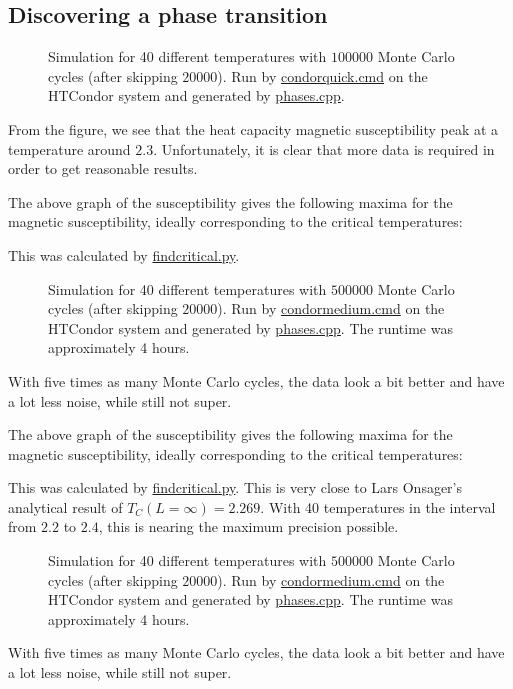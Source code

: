 \documentclass[12pt,english,a4paper]{article}
\newcommand{\program}[1]{\href{https://github.com/anjohan/Offentlig/blob/master/FYS3150/Oblig4/#1}{#1}}
\begin{document}
\subsection{Discovering a phase transition}\label{phases}

\begin{figure}[H]
\centering

\caption{Simulation for 40 different temperatures with \(\num{100000}\) Monte Carlo cycles (after skipping \(\num{20000}\)). Run by \program{condorquick.cmd} on the HTCondor system and generated by \program{phases.cpp}.}
\end{figure}
From the figure, we see that the heat capacity magnetic susceptibility peak at a temperature around \(\num{2.3}\). Unfortunately, it is clear that more data is required in order to get reasonable results.

The above graph of the susceptibility gives the following maxima for the magnetic susceptibility, ideally corresponding to the critical temperatures:

This was calculated by \program{findcritical.py}.

\begin{figure}[H]
\centering

\caption{Simulation for 40 different temperatures with \(\num{500000}\) Monte Carlo cycles (after skipping \(\num{20000}\)). Run by \program{condormedium.cmd} on the HTCondor system and generated by \program{phases.cpp}. The runtime was approximately 4 hours.}
\end{figure}
With five times as many Monte Carlo cycles, the data look a bit better and have a lot less noise, while still not super.

The above graph of the susceptibility gives the following maxima for the magnetic susceptibility, ideally corresponding to the critical temperatures:

This was calculated by \program{findcritical.py}. This is very close to Lars Onsager's analytical result of \(T_C(L=\infty)=\num{2.269}\). With 40 temperatures in the interval from \(\num{2.2}\) to \(\num{2.4}\), this is nearing the maximum precision possible.

\begin{figure}[H]
\centering

\caption{Simulation for 40 different temperatures with \(\num{500000}\) Monte Carlo cycles (after skipping \(\num{20000}\)). Run by \program{condormedium.cmd} on the HTCondor system and generated by \program{phases.cpp}. The runtime was approximately 4 hours.}
\end{figure}
With five times as many Monte Carlo cycles, the data look a bit better and have a lot less noise, while still not super.
\end{document}
